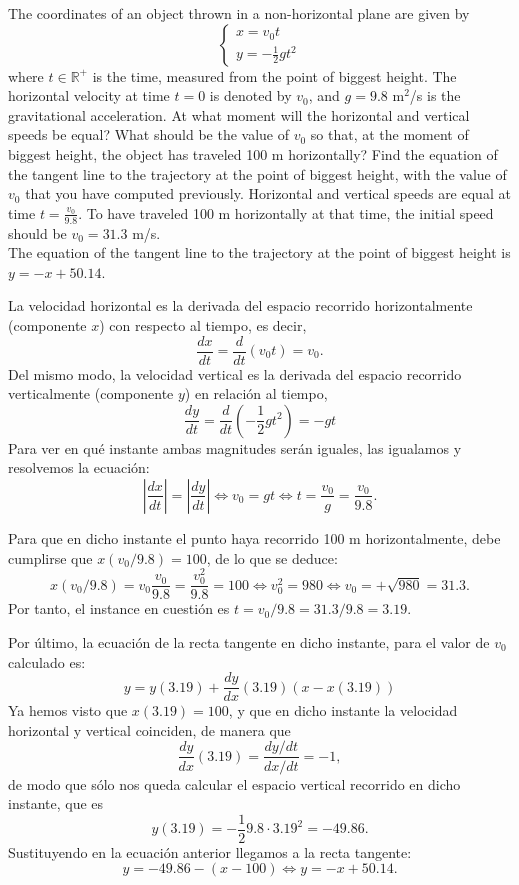 {The coordinates of an object thrown in a non-horizontal plane are given by
\[
\begin{cases}
x=v_0t \\
y=-\frac{1}{2}gt^2
\end{cases}
\]
where $t\in \mathbb{R}^{+}$ is the time, measured from the point of biggest height.
The horizontal velocity at time $t=0$ is denoted by $v_0$, and $g=9.8$ m$^2$/s is the gravitational acceleration.
At what moment will the horizontal and vertical speeds be equal?
What should be the value of $v_0$ so that, at the moment of biggest height, the object has traveled 100 m horizontally?
Find the equation of the tangent line to the trajectory at the point of biggest height, with the value of $v_0$ that you have computed previously.
}
{
Horizontal and vertical speeds are equal at time $ t=\frac{v_0}{9.8}$. To have traveled 100 m horizontally at that time, the initial speed should be $v_0 = 31.3$ m/s.\\
The equation of the tangent line to the trajectory at the point of biggest height is $y =-x+50.14$.
}
{La velocidad horizontal es la derivada del espacio recorrido horizontalmente (componente $x$) con respecto al tiempo, es decir,
\[
\frac{dx}{dt} = \frac{d}{dt}(v_0t)=v_0.
\]
Del mismo modo, la velocidad vertical es la derivada del espacio recorrido verticalmente (componente $y$) en relación al tiempo,
\[
\frac{dy}{dt} = \frac{d}{dt}(-\frac{1}{2}gt^2)=-gt
\]
Para ver en qué instante ambas magnitudes serán iguales, las igualamos y resolvemos la ecuación:
\[
|\frac{dx}{dt}|=|\frac{dy}{dt}| \Leftrightarrow v_0 = gt \Leftrightarrow t=\frac{v_0}{g}=\frac{v_0}{9.8}.
\]

Para que en dicho instante el punto haya recorrido 100 m horizontalmente, debe cumplirse que $x(v_0/9.8)=100$, de lo que se deduce:
\[
x(v_0/9.8)=v_0\frac{v_0}{9.8} = \frac{v_0^2}{9.8}=100 \Leftrightarrow v_0^2 = 980 \Leftrightarrow v_0 = +\sqrt{980}= 31.3.
\]
Por tanto, el instance en cuestión es $t=v_0/9.8= 31.3/9.8 = 3.19$.

Por último, la ecuación de la recta tangente en dicho instante, para el valor de $v_0$ calculado es:
\[
y = y(3.19) + \frac{dy}{dx}(3.19) (x-x(3.19))
\]
Ya hemos visto que $x(3.19)=100$, y que en dicho instante la velocidad horizontal y vertical coinciden, de manera que
\[
\frac{dy}{dx}(3.19)=\frac{dy/dt}{dx/dt}=-1,
\]
de modo que sólo nos queda calcular el espacio vertical recorrido en dicho instante, que es
\[
y(3.19)=-\frac{1}{2}9.8\cdot 3.19^2= -49.86.
\]
Sustituyendo en la ecuación anterior llegamos a la recta tangente:
\[
y = -49.86-(x-100) \Leftrightarrow y=-x+50.14.
\]
}



